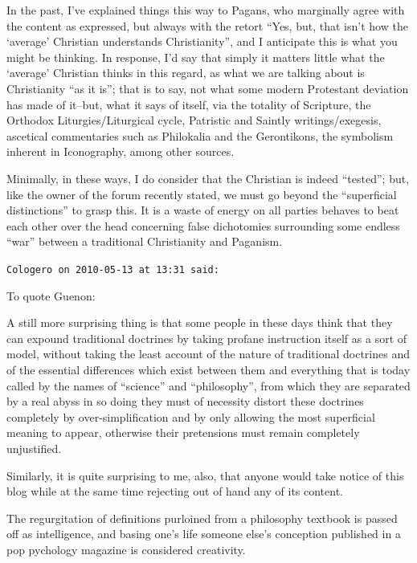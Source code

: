 \begin{footnotesize}
\begin{sffamily}
In the past, I've explained things this way to Pagans, who marginally agree with the content as expressed, but always with the retort ``Yes, but, that isn't how the `average' Christian understands Christianity'', and I anticipate this is what you might be thinking. In response, I'd say that simply it matters little what the `average' Christian thinks in this regard, as what we are talking about is Christianity ``as it is''; that is to say, not what some modern Protestant deviation has made of it--but, what it says of itself, via the totality of Scripture, the Orthodox Liturgies/Liturgical cycle, Patristic and Saintly writings/exegesis, ascetical commentaries such as Philokalia and the Gerontikons, the symbolism inherent in Iconography, among other sources.

Minimally, in these ways, I do consider that the Christian is indeed ``tested''; but, like the owner of the forum recently stated, we must go beyond the ``superficial distinctions'' to grasp this. It is a waste of energy on all parties behaves to beat each other over the head concerning false dichotomies surrounding some endless ``war'' between a traditional Christianity and Paganism.

\hfill

\texttt{Cologero on 2010-05-13 at 13:31 said:}

To quote Guenon:

\begin{quotex}\footnotesize

A still more surprising thing is that some people in these days think that they can expound traditional doctrines by taking profane instruction itself as a sort of model, without taking the least account of the nature of traditional doctrines and of the essential differences which exist between them and everything that is today called by the names of ``science'' and ``philosophy'', from which they are separated by a real abyss in so doing they must of necessity distort these doctrines completely by over-simplification and by only allowing the most superficial meaning to appear, otherwise their pretensions must remain completely unjustified.
\end{quotex}


Similarly, it is quite surprising to me, also, that anyone would take notice of this blog while at the same time rejecting out of hand any of its content.

The regurgitation of definitions purloined from a philosophy textbook is passed off as intelligence, and basing one's life someone else's conception published in a pop pychology magazine is considered creativity.


\end{sffamily}
\end{footnotesize}
